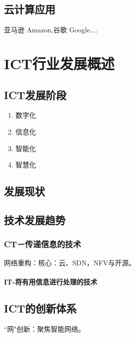 \documentclass{report}
\begin{document}
	\section{云计算应用
	}
	亚马逊 Amazon,谷歌 Google....
	\chapter{ICT行业发展概述}
	\section{ICT发展阶段}
	\begin{enumerate}
		\item 数字化
		\item 信息化
		\item 智能化
		\item 智慧化
	\end{enumerate}
	\section{发展现状}
	\section{技术发展趋势}
	\subsection{CT－传递信息的技术}
	网络重构：核心：云、SDN，NFV与开源。
	\subsubsection{IT-将有用信息进行处理的技术}
	\section{ICT的创新体系}
	“网"创新：聚焦智能网络。
\end{document}

